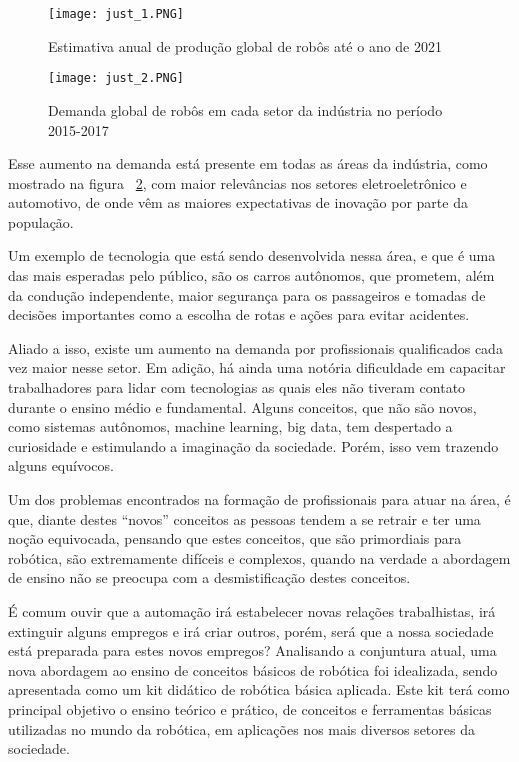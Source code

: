 \begin{figure}[h!]										\caption{Estimativa anual de produção global de robôs até o ano de 2021} \label{fig:just_1}		
	\centering										
	\texttt{[image: just\_1.PNG]}
\end{figure}

\begin{figure}[h!]										\caption{Demanda global de robôs em cada setor da indústria no período 2015-2017} \label{fig:just_2}		
	\centering										
	\texttt{[image: just\_2.PNG]}
\end{figure}

Esse aumento na demanda está presente em todas as áreas da indústria, como mostrado na figura ~\ref{fig:just_2}, com maior relevâncias nos setores eletroeletrônico e automotivo, de onde vêm as maiores expectativas de inovação por parte da população.
 
Um exemplo de tecnologia que está sendo desenvolvida nessa área, e que é uma das mais esperadas pelo público, são os carros autônomos, que prometem, além da condução independente, maior segurança para os passageiros e tomadas de decisões importantes como a escolha de rotas e ações para evitar acidentes.

Aliado a isso, existe um aumento na demanda por profissionais qualificados cada vez maior nesse setor. Em adição, há ainda uma notória dificuldade em capacitar trabalhadores para lidar com tecnologias as quais eles não tiveram contato durante o ensino médio e fundamental. Alguns conceitos, que não são novos, como sistemas autônomos, machine learning, big data, tem despertado a curiosidade e estimulando a imaginação da sociedade. Porém, isso vem trazendo alguns equívocos.

Um dos problemas encontrados na formação de profissionais para atuar na área, é que, diante destes “novos” conceitos as pessoas tendem a se retrair e ter uma noção equivocada, pensando que estes conceitos, que são primordiais para robótica, são extremamente difíceis e complexos, quando na verdade a abordagem de ensino não se preocupa com a desmistificação destes conceitos.

É comum ouvir que a automação irá estabelecer novas relações trabalhistas, irá extinguir alguns empregos e irá criar outros, porém, será que a nossa sociedade está preparada para estes novos empregos? 
Analisando a conjuntura atual, uma nova abordagem ao ensino de conceitos básicos de robótica foi idealizada, sendo apresentada como um kit didático de robótica básica aplicada. Este kit terá como principal objetivo o ensino teórico e prático, de conceitos e ferramentas básicas utilizadas no mundo da robótica, em aplicações nos mais diversos setores da sociedade.

